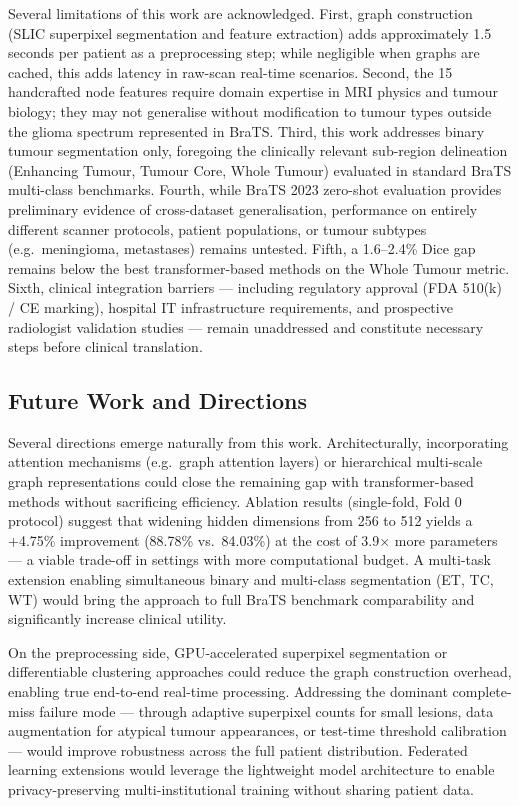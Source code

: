 Several limitations of this work are acknowledged. First, graph construction (SLIC superpixel segmentation and feature extraction) adds approximately 1.5 seconds per patient as a preprocessing step; while negligible when graphs are cached, this adds latency in raw-scan real-time scenarios. Second, the 15 handcrafted node features require domain expertise in MRI physics and tumour biology; they may not generalise without modification to tumour types outside the glioma spectrum represented in BraTS. Third, this work addresses binary tumour segmentation only, foregoing the clinically relevant sub-region delineation (Enhancing Tumour, Tumour Core, Whole Tumour) evaluated in standard BraTS multi-class benchmarks. Fourth, while BraTS 2023 zero-shot evaluation provides preliminary evidence of cross-dataset generalisation, performance on entirely different scanner protocols, patient populations, or tumour subtypes (e.g.\ meningioma, metastases) remains untested. Fifth, a 1.6--2.4\% Dice gap remains below the best transformer-based methods on the Whole Tumour metric. Sixth, clinical integration barriers — including regulatory approval (FDA 510(k) / CE marking), hospital IT infrastructure requirements, and prospective radiologist validation studies — remain unaddressed and constitute necessary steps before clinical translation.


\subsection{Future Work and Directions}

Several directions emerge naturally from this work. Architecturally, incorporating attention mechanisms (e.g.\ graph attention layers) or hierarchical multi-scale graph representations could close the remaining gap with transformer-based methods without sacrificing efficiency. Ablation results (single-fold, Fold 0 protocol) suggest that widening hidden dimensions from 256 to 512 yields a +4.75\% improvement (88.78\% vs.\ 84.03\%) at the cost of 3.9$\times$ more parameters — a viable trade-off in settings with more computational budget. A multi-task extension enabling simultaneous binary and multi-class segmentation (ET, TC, WT) would bring the approach to full BraTS benchmark comparability and significantly increase clinical utility.

On the preprocessing side, GPU-accelerated superpixel segmentation or differentiable clustering approaches could reduce the graph construction overhead, enabling true end-to-end real-time processing. Addressing the dominant complete-miss failure mode — through adaptive superpixel counts for small lesions, data augmentation for atypical tumour appearances, or test-time threshold calibration — would improve robustness across the full patient distribution. Federated learning extensions would leverage the lightweight model architecture to enable privacy-preserving multi-institutional training without sharing patient data.

